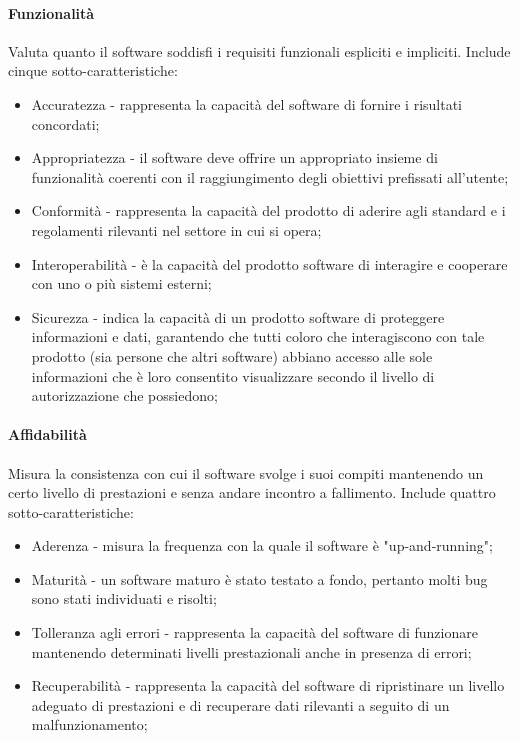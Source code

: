 \documentclass[10pt]{article}
\begin{document}
\begin{justify}
            \paragraph{Funzionalità}
            Valuta quanto il software soddisfi i requisiti funzionali espliciti e impliciti. Include cinque sotto-caratteristiche:
            \begin{itemize}
                \item Accuratezza - rappresenta la capacità del software di fornire i risultati concordati;
                \item Appropriatezza - il software deve offrire un appropriato insieme di funzionalità coerenti con il raggiungimento degli obiettivi prefissati all'utente;
                \item Conformità - rappresenta la capacità del prodotto di aderire agli standard e i regolamenti rilevanti nel settore in cui si opera;
                \item Interoperabilità - è la capacità del prodotto software di interagire e cooperare con uno o più sistemi esterni;
                \item Sicurezza - indica la capacità di un prodotto software di proteggere informazioni e dati, garantendo che tutti coloro che interagiscono con tale prodotto (sia persone che altri
                software) abbiano accesso alle sole informazioni che è loro consentito visualizzare secondo il livello di autorizzazione che possiedono;
            \end{itemize}

            \paragraph{Affidabilità}
            Misura la consistenza con cui il software svolge i suoi compiti mantenendo un certo livello di prestazioni e senza andare incontro a fallimento. Include quattro sotto-caratteristiche:
            \begin{itemize}
                \item Aderenza - misura la frequenza con la quale il software è "up-and-running";
                \item Maturità - un software maturo è stato testato a fondo, pertanto molti bug sono stati individuati e risolti;
                \item Tolleranza agli errori - rappresenta la capacità del software di funzionare mantenendo determinati livelli prestazionali anche in presenza di errori;
                \item Recuperabilità - rappresenta la capacità del software di ripristinare un livello adeguato di prestazioni e di recuperare dati rilevanti a seguito di un malfunzionamento;
            \end{itemize}


\end{justify}
\end{document}

